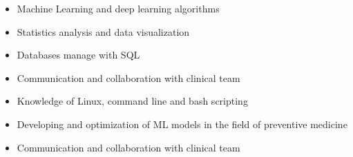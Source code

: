 \documentclass[10pt,a4paper,ragged2e]{altacv}
\begin{document}


\begin{fullwidth}
\makecvheader
\end{fullwidth}



\begin{itemize}
\item  Machine Learning and deep learning algorithms
\item  Statistics analysis and data visualization
\item  Databases manage with SQL
\item Communication and collaboration with clinical team
\item Knowledge of Linux, command line and bash scripting
\end{itemize}

\divider

\begin{itemize}
\item Developing and optimization of ML models in the field of preventive medicine
\item Communication and collaboration with clinical team
\end{itemize}
\end{document}
